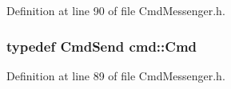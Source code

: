 Definition at line 90 of file Cmd\+Messenger.\+h.

\hypertarget{namespacecmd_af9b58ca395c80edd1335e21d1b9f4c99}{
\subsubsection[{Cmd}]{\setlength{\rightskip}{0pt plus 5cm}typedef {\bf Cmd\+Send} {\bf cmd\+::\+Cmd}}}\label{namespacecmd_af9b58ca395c80edd1335e21d1b9f4c99}


Definition at line 89 of file Cmd\+Messenger.\+h.


